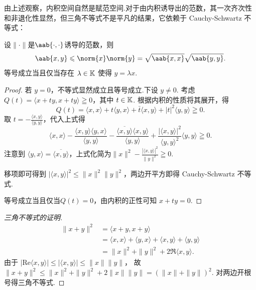 由上述观察，内积空间自然是赋范空间.对于由内积诱导出的范数，其一次齐次性和非退化性显然，但三角不等式不是平凡的结果，它依赖于 Cauchy-Schwartz 不等式：

\begin{lemma}
    设$\|\cdot \|$是$\aab{\cdot,\cdot}$诱导的范数，则
    \begin{equation*}
        \aab{x,y} \leq \norm{x}\norm{y} =\sqrt{\aab{x,x}}\sqrt{\aab{y,y}}.
    \end{equation*}
    等号成立当且仅当存在 $\lambda \in \mathbb{K}$ 使得 $y = \lambda x$.
\end{lemma}
\begin{proof}
    若 $y = 0$，不等式显然成立且等号成立.下设 $y \neq 0$.
    考虑 $Q(t) = \langle x + ty, x + ty \rangle \geqq 0$，其中 $t \in \mathbb{K}$.
    根据内积的性质将其展开，得
    \[
        Q(t) = \langle x, x \rangle + t \langle y, x \rangle + \bar{t} \langle x, y \rangle + |t|^2 \langle y, y \rangle \geqq 0.
    \]
    取 $t = -\frac{\langle x, y \rangle}{\langle y, y \rangle}$，代入上式得
    \[
        \langle x, x \rangle - \frac{\langle x, y \rangle \langle y, x \rangle}{\langle y, y \rangle} - \frac{\overline{\langle x, y \rangle} \langle x, y \rangle}{\langle y, y \rangle} + \frac{|\langle x, y \rangle|^2}{\langle y, y \rangle^2} \langle y, y \rangle \geqq 0.
    \]
    注意到 $\langle y, x \rangle = \overline{\langle x, y \rangle}$，上式化简为$\|x\|^2 - \frac{|\langle x, y \rangle|^2}{\|y\|^2} \geqq 0.$\par
    移项即可得到 $|\langle x, y \rangle|^2 \leq \|x\|^2 \|y\|^2$，两边开平方即得 Cauchy-Schwartz 不等式.\par
    等号成立当且仅当$Q(t) = 0$，由内积的正性可知 $x + ty = 0$.
\end{proof}


\begin{proof}[三角不等式的证明]
    \begin{align*}
        \|x + y\|^2 &= \langle x + y, x + y \rangle \\[-3pt]
        &= \langle x, x \rangle + \langle y, x \rangle + \langle x, y \rangle + \langle y, y \rangle \\[-3pt]
        &= \|x\|^2 + \|y\|^2 + 2\Re \langle x, y \rangle.
    \end{align*}
    由于 $|\text{Re} \langle x, y \rangle| \leq |\langle x, y \rangle| \leq \|x\| \|y\|$，
    故 $\|x + y\|^2 \leq \|x\|^2 + \|y\|^2 + 2\|x\| \|y\| = (\|x\| + \|y\|)^2$.
    对两边开根号得三角不等式.
\end{proof}

